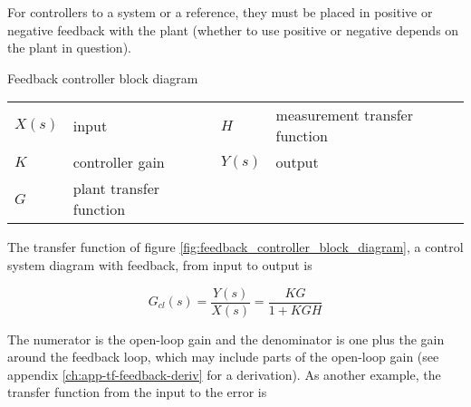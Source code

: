 For \glspl{controller} to  a system or
 a reference, they must be placed in positive or
negative feedback with the \gls{plant} (whether to use positive or negative
depends on the \gls{plant} in question).

\begin{bookfigure}

  \caption{Feedback controller block diagram}
  \label{fig:feedback_controller_block_diagram}
\end{bookfigure}

\begin{figurekey}
  \begin{tabulary}{\linewidth}{LLLL}
    $X(s)$ & input & $H$ & measurement transfer function \\
    $K$ & controller gain & $Y(s)$ & output \\
    $G$ & plant transfer function & & \\
  \end{tabulary}
\end{figurekey}

The transfer function of figure \ref{fig:feedback_controller_block_diagram}, a
control system diagram with feedback, from input to output is

\begin{equation}
  G_{cl}(s) = \frac{Y(s)}{X(s)} = \frac{KG}{1 + KGH}
\end{equation}

The numerator is the \gls{open-loop gain} and the denominator is one plus the
gain around the feedback loop, which may include parts of the
\gls{open-loop gain} (see appendix \ref{ch:app-tf-feedback-deriv} for a
derivation). As another example, the transfer function from the input to the
error is

